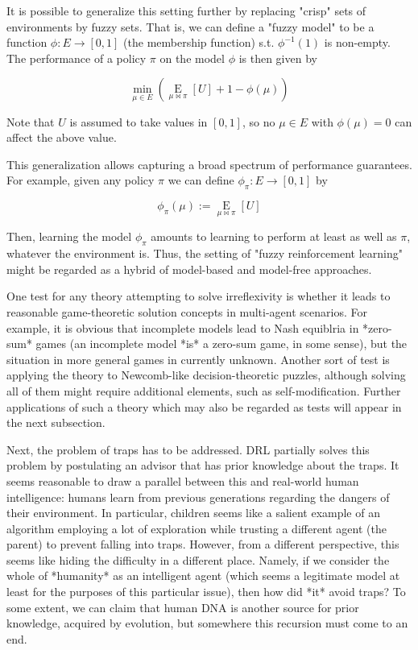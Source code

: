 \documentclass[a4paper]{article}
\newcommand{\AP}[1]{\left(#1\right)}
\newcommand{\AB}[1]{\left[#1\right]}
\newcommand{\Ea}[2]{\underset{#1}{\operatorname{E}}\AB{#2}}
\begin{document}
It is possible to generalize this setting further by replacing "crisp" sets of environments by fuzzy sets. That is, we can define a "fuzzy model" to be a function $\phi: E \rightarrow [0,1]$ (the membership function) s.t. $\phi^{-1}(1)$ is non-empty. The performance of a policy $\pi$ on the model $\phi$ is then given by

$$\min_{\mu \in E}\AP{{\Ea{\mu\bowtie\pi}{U}}+1-\phi(\mu)}$$

Note that $U$ is assumed to take values in $[0,1]$, so no $\mu \in E$ with $\phi(\mu) = 0$ can affect the above value.

This generalization allows capturing a broad spectrum of performance guarantees. For example, given any policy $\pi$ we can define $\phi_\pi: E \rightarrow [0,1]$ by

$$\phi_\pi(\mu):=\Ea{\mu\bowtie\pi}{U}$$

Then, learning the model $\phi_\pi$ amounts to learning to perform at least as well as $\pi$, whatever the environment is. Thus, the setting of "fuzzy reinforcement learning" might be regarded as a hybrid of model-based and model-free approaches.

One test for any theory attempting to solve irreflexivity is whether it leads to reasonable game-theoretic solution concepts in multi-agent scenarios. For example, it is obvious that incomplete models lead to Nash equiblria in *zero-sum* games (an incomplete model *is* a zero-sum game, in some sense), but the situation in more general games in currently unknown. Another sort of test is applying the theory to Newcomb-like decision-theoretic puzzles, although solving all of them might require additional elements, such as self-modification. Further applications of such a theory which may also be regarded as tests will appear in the next subsection.

Next, the problem of traps has to be addressed. DRL partially solves this problem by postulating an advisor that has prior knowledge about the traps. It seems reasonable to draw a parallel between this and real-world human intelligence: humans learn from previous generations regarding the dangers of their environment. In particular, children seems like a salient example of an algorithm employing a lot of exploration while trusting a different agent (the parent) to prevent falling into traps. However, from a different perspective, this seems like hiding the difficulty in a different place. Namely, if we consider the whole of *humanity* as an intelligent agent (which seems a legitimate model at least for the purposes of this particular issue), then how did *it* avoid traps? To some extent, we can claim that human DNA is another source for prior knowledge, acquired by evolution, but somewhere this recursion must come to an end.
\end{document}
